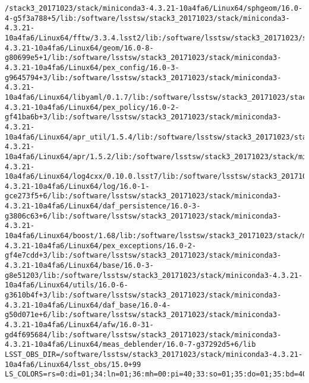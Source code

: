\begin{verbatim}
/stack3_20171023/stack/miniconda3-4.3.21-10a4fa6/Linux64/sphgeom/16.0-4-g5f3a788+5/lib:/software/lsstsw/stack3_20171023/stack/miniconda3-4.3.21-10a4fa6/Linux64/fftw/3.3.4.lsst2/lib:/software/lsstsw/stack3_20171023/stack/miniconda3-4.3.21-10a4fa6/Linux64/geom/16.0-8-g80699e5+1/lib:/software/lsstsw/stack3_20171023/stack/miniconda3-4.3.21-10a4fa6/Linux64/pex_config/16.0-3-g9645794+3/lib:/software/lsstsw/stack3_20171023/stack/miniconda3-4.3.21-10a4fa6/Linux64/libyaml/0.1.7/lib:/software/lsstsw/stack3_20171023/stack/miniconda3-4.3.21-10a4fa6/Linux64/pex_policy/16.0-2-gf41ba6b+3/lib:/software/lsstsw/stack3_20171023/stack/miniconda3-4.3.21-10a4fa6/Linux64/apr_util/1.5.4/lib:/software/lsstsw/stack3_20171023/stack/miniconda3-4.3.21-10a4fa6/Linux64/apr/1.5.2/lib:/software/lsstsw/stack3_20171023/stack/miniconda3-4.3.21-10a4fa6/Linux64/log4cxx/0.10.0.lsst7/lib:/software/lsstsw/stack3_20171023/stack/miniconda3-4.3.21-10a4fa6/Linux64/log/16.0-1-gce273f5+6/lib:/software/lsstsw/stack3_20171023/stack/miniconda3-4.3.21-10a4fa6/Linux64/daf_persistence/16.0-3-g3806c63+6/lib:/software/lsstsw/stack3_20171023/stack/miniconda3-4.3.21-10a4fa6/Linux64/boost/1.68/lib:/software/lsstsw/stack3_20171023/stack/miniconda3-4.3.21-10a4fa6/Linux64/pex_exceptions/16.0-2-gf4e7cdd+3/lib:/software/lsstsw/stack3_20171023/stack/miniconda3-4.3.21-10a4fa6/Linux64/base/16.0-3-g8e51203/lib:/software/lsstsw/stack3_20171023/stack/miniconda3-4.3.21-10a4fa6/Linux64/utils/16.0-6-g3610b4f+3/lib:/software/lsstsw/stack3_20171023/stack/miniconda3-4.3.21-10a4fa6/Linux64/daf_base/16.0-4-g50d071e+6/lib:/software/lsstsw/stack3_20171023/stack/miniconda3-4.3.21-10a4fa6/Linux64/afw/16.0-31-gd4f695684/lib:/software/lsstsw/stack3_20171023/stack/miniconda3-4.3.21-10a4fa6/Linux64/meas_deblender/16.0-7-g37292d5+6/lib
LSST_OBS_DIR=/software/lsstsw/stack3_20171023/stack/miniconda3-4.3.21-10a4fa6/Linux64/lsst_obs/15.0+99
LS_COLORS=rs=0:di=01;34:ln=01;36:mh=00:pi=40;33:so=01;35:do=01;35:bd=40;33;01:cd=40;33;01:or=40;31;01:mi=01;05;37;41:su=37;41:sg=30;43:ca=30;41:tw=30;42:ow=34;42:st=37;44:ex=01;32:*.tar=01;31:*.tgz=01;31:*.arc=01;31:*.arj=01;31:*.taz=01;31:*.lha=01;31:*.lz4=01;31:*.lzh=01;31:*.lzma=01;31:*.tlz=01;31:*.txz=01;31:*.tzo=01;31:*.t7z=01;31:*.zip=01;31:*.z=01;31:*.Z=01;31:*.dz=01;31:*.gz=01;31:*.lrz=01;31:*.lz=01;31:*.lzo=01;31:*.xz=01;31:*.bz2=01;31:*.bz=01;31:*.tbz=01;31:*.tbz2=01;31:*.tz=01;31:*.deb=01;31:*.rpm=01;31:*.jar=01;31:*.war=01;31:*.ear=01;31:*.sar=01;31:*.rar=01;31:*.alz=01;31:*.ace=01;31:*.zoo=01;31:*.cpio=01;31:*.7z=01;31:*.rz=01;31:*.cab=01;31:*.jpg=01;35:*.jpeg=01;35:*.gif=01;35:*.bmp=01;35:*.pbm=01;35:*.pgm=01;35:*.ppm=01;35:*.tga=01;35:*.xbm=01;35:*.xpm=01;35:*.tif=01;35:*.tiff=01;35:*.png=01;35:*.svg=01;35:*.svgz=01;35:*.mng=01;35:*.pcx=01;35:*.mov=01;35:*.mpg=01;35:*.mpeg=01;35:*.m2v=01;35:*.mkv=01;35:*.webm=01;35:*.ogm=01;35:*.mp4=01;35:*.m4v=01;35:*.mp4v=01;35:*.vob=01;35:*.qt=01;35:*.nuv=01;35:*.wmv=01;35:*.asf=01;35:*.rm=01;35:*.rmvb=01;35:*.flc=01;35:*.avi=01;35:*.fli=01;35:*.flv=01;35:*.gl=01;35:*.dl=01;35:*.xcf=01;35:*.xwd=01;35:*.yuv=01;35:*.cgm=01;35:*.emf=01;35:*.axv=01;35:*.anx=01;35:*.ogv=01;35:*.ogx=01;35:*.aac=01;36:*.au=01;36:*.flac=01;36:*.mid=01;36:*.midi=01;36:*.mka=01;36:*.mp3=01;36:*.mpc=01;36:*.ogg=01;36:*.ra=01;36:*.wav=01;36:*.axa=01;36:*.oga=01;36:*.spx=01;36:*.xspf=01;36:

\end{verbatim}
